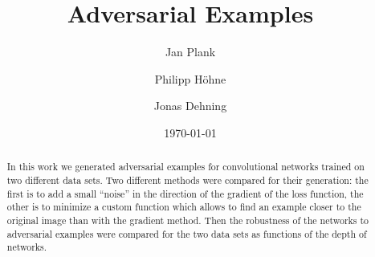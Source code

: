 \documentclass[%
 reprint,
 amsmath,amssymb,
 aps,
]{revtex4-1}
\begin{document}

\title{Adversarial Examples}%

\author{Jan Plank}
\author{Philipp Höhne}%
%


\author{Jonas Dehning}
%

\date{\today}%

\begin{abstract}
In this work we generated adversarial examples for convolutional networks trained on two different data sets. Two different methods were compared for their generation: the first is to add a small ``noise'' in the direction of the gradient of the loss function, the other is to minimize a custom function which allows to find an example closer to the original image than with the gradient method. Then the robustness of the networks to adversarial examples were compared for the two data sets as functions of the depth of networks.


\end{abstract}

\maketitle
\end{document}
